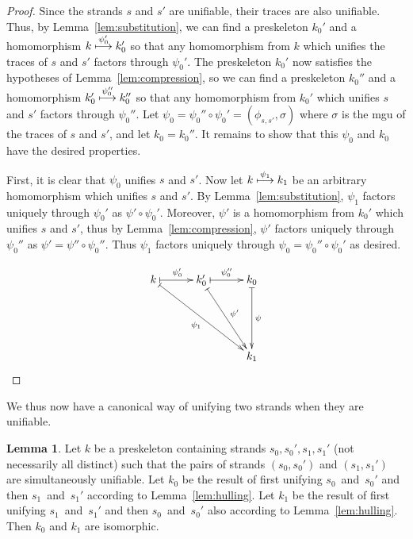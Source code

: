 \documentclass[12pt]{article}
\theoremstyle{definition}
\newtheorem{lem}[thm]{Lemma}
\begin{document}
\begin{proof}
Since the strands $s$ and $s'$ are unifiable, their traces are also
unifiable.  Thus, by Lemma~\ref{lem:substitution}, we can find a
preskeleton $k_0'$ and a homomorphism $k\stackrel{\psi_0'}{\longmapsto}k_0'$
so that any homomorphism from $k$ which unifies the traces of $s$ and $s'$
factors through $\psi_0'$.  The preskeleton $k_0'$ now satisfies
the hypotheses of Lemma~\ref{lem:compression}, so we can find a
preskeleton $k_0''$ and a homomorphism
$k_0'\stackrel{\psi_0''}{\longmapsto}k_0''$ so that any homomorphism from
$k_0'$ which unifies $s$ and $s'$ factors through $\psi_0''$.
Let $\psi_0=\psi_0''\circ\psi_0'=(\phi_{s,s'},\sigma)$ where
$\sigma$ is the mgu of the traces of $s$ and $s'$, and let $k_0=k_0''$.
It remains to show that this $\psi_0$ and $k_0$ have the desired
properties.

First, it is clear that $\psi_0$ unifies $s$ and $s'$.  Now let
$k\stackrel{\psi_1}{\longmapsto}k_1$ be an arbitrary homomorphism which unifies
$s$ and $s'$.  By Lemma~\ref{lem:substitution}, $\psi_1$ factors uniquely
through $\psi_0'$ as $\psi'\circ\psi_0'$.  Moreover, $\psi'$ is a
homomorphism from $k_0'$ which unifies $s$ and $s'$, thus by
Lemma~\ref{lem:compression}, $\psi'$ factors uniquely through
$\psi_0''$ as $\psi'=\psi''\circ\psi_0''$.  Thus $\psi_1$ factors
uniquely through $\psi_0=\psi_0''\circ\psi_0'$ as desired.

$$\xymatrix@C=3em{
k\ar@{|->}[r]^{\psi_0'} \ar@{|->}[rrdd]_{\psi_1} &
k_0' \ar@{|->}[rdd]^{\psi'} \ar@{|->}[r]^{\psi_0''} &
k_0 \ar@{|->}[dd]^{\psi}\\
& &\\
& &k_1}$$
\end{proof}

We thus now have a canonical way of unifying two strands when they
are unifiable.

\begin{lem}\label{lem:unify-commute}
Let $k$ be a preskeleton containing strands $s_0,s_0',s_1,s_1'$
(not necessarily all distinct) such that the pairs of strands
$(s_0,s_0')$ and $(s_1,s_1')$ are simultaneously unifiable.  Let
$k_0$ be the result of first unifying $s_0$~and~$s_0'$ and then
$s_1$~and~$s_1'$ according to Lemma~\ref{lem:hulling}.  Let
$k_1$ be the result of first unifying $s_1$~and~$s_1'$ and then
$s_0$~and~$s_0'$ also according to Lemma~\ref{lem:hulling}.
Then $k_0$ and $k_1$ are isomorphic.
\end{lem}
\end{document}

